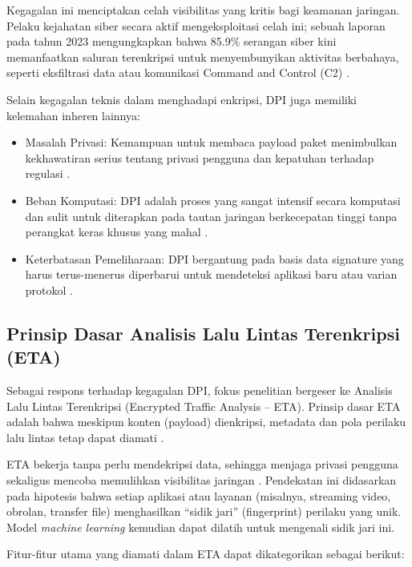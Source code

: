 Kegagalan ini menciptakan celah visibilitas yang kritis bagi keamanan jaringan. Pelaku kejahatan siber secara aktif mengeksploitasi celah ini; sebuah laporan pada tahun 2023 mengungkapkan bahwa 85.9\% serangan siber kini memanfaatkan saluran terenkripsi untuk menyembunyikan aktivitas berbahaya, seperti eksfiltrasi data atau komunikasi Command and Control (C2) \citep{sharma2024survey,anderson2018deciphering}.

Selain kegagalan teknis dalam menghadapi enkripsi, DPI juga memiliki kelemahan inheren lainnya:

\begin{itemize}
  \item Masalah Privasi: Kemampuan untuk membaca payload paket menimbulkan kekhawatiran serius tentang privasi pengguna dan kepatuhan terhadap regulasi \citep{dainotti2012issues,azab2024network}.
  \item Beban Komputasi: DPI adalah proses yang sangat intensif secara komputasi dan sulit untuk diterapkan pada tautan jaringan berkecepatan tinggi tanpa perangkat keras khusus yang mahal \citep{dainotti2012issues}.
  \item Keterbatasan Pemeliharaan: DPI bergantung pada basis data signature yang harus terus-menerus diperbarui untuk mendeteksi aplikasi baru atau varian protokol \citep{azab2024network}.
\end{itemize}

\subsection{Prinsip Dasar Analisis Lalu Lintas Terenkripsi (ETA)}
Sebagai respons terhadap kegagalan DPI, fokus penelitian bergeser ke Analisis Lalu Lintas Terenkripsi (Encrypted Traffic Analysis -- ETA). Prinsip dasar ETA adalah bahwa meskipun konten (payload) dienkripsi, metadata dan pola perilaku lalu lintas tetap dapat diamati \citep{sharma2024survey,anderson2018deciphering}.

ETA bekerja tanpa perlu mendekripsi data, sehingga menjaga privasi pengguna sekaligus mencoba memulihkan visibilitas jaringan \citep{anderson2018deciphering}. Pendekatan ini didasarkan pada hipotesis bahwa setiap aplikasi atau layanan (misalnya, streaming video, obrolan, transfer file) menghasilkan ``sidik jari'' (fingerprint) perilaku yang unik. Model \textit{machine learning} kemudian dapat dilatih untuk mengenali sidik jari ini.

Fitur-fitur utama yang diamati dalam ETA dapat dikategorikan sebagai berikut:


